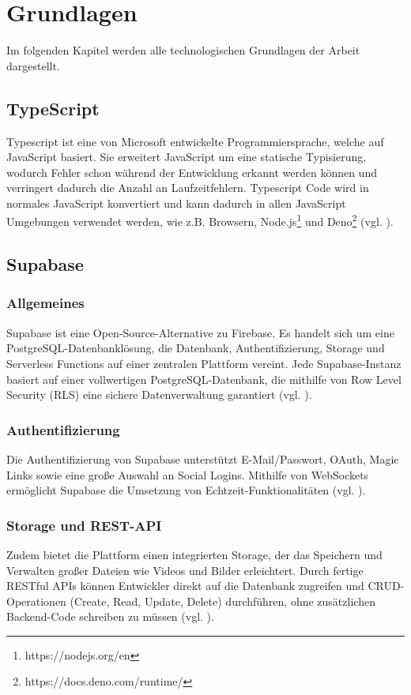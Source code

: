 \documentclass[oneside]{ausarbeitung}
\begin{document}
\chapter{Grundlagen}
\label{chap:grundlagen}

Im folgenden Kapitel werden alle technologischen Grundlagen der Arbeit dargestellt.
 
\section{TypeScript}
Typescript ist eine von Microsoft entwickelte Programmiersprache, welche auf JavaScript basiert. Sie erweitert JavaScript um eine statische Typisierung, wodurch Fehler schon während der Entwicklung erkannt werden können und verringert dadurch die Anzahl an Laufzeitfehlern. Typescript Code wird in normales JavaScript konvertiert und kann dadurch in allen JavaScript Umgebungen verwendet werden, wie z.B. Browsern, Node.js\footnote{https://nodejs.org/en} und Deno\footnote{https://docs.deno.com/runtime/} (vgl. \parencite{typescript}). 

\section{Supabase}
\subsection{Allgemeines}
Supabase ist eine Open-Source-Alternative zu Firebase. Es handelt sich um eine PostgreSQL-Datenbanklösung, die Datenbank, Authentifizierung, Storage und Serverless Functions auf einer zentralen Plattform vereint. Jede Supabase-Instanz basiert auf einer vollwertigen PostgreSQL-Datenbank, die mithilfe von Row Level Security (RLS) eine sichere Datenverwaltung garantiert (vgl. \parencite{supabase}).

\subsection{Authentifizierung}
Die Authentifizierung von Supabase unterstützt E-Mail/Passwort, OAuth, Magic Links sowie eine große Auswahl an Social Logins. Mithilfe von WebSockets ermöglicht Supabase die Umsetzung von Echtzeit-Funktionalitäten (vgl. \parencite{supabase}).

\subsection{Storage und REST-API}
Zudem bietet die Plattform einen integrierten Storage, der das Speichern und Verwalten großer Dateien wie Videos und Bilder erleichtert. Durch fertige RESTful APIs können Entwickler direkt auf die Datenbank zugreifen und CRUD-Operationen (Create, Read, Update, Delete) durchführen, ohne zusätzlichen Backend-Code schreiben zu müssen (vgl. \parencite{supabase}). 
\end{document}
